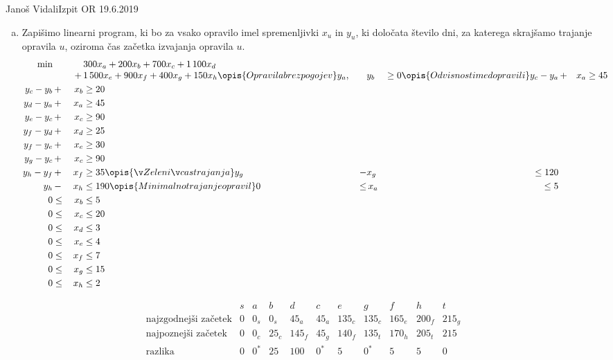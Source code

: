 \begin{naloga}{Janoš Vidali}{Izpit OR 19.6.2019}
\begin{odgovor}
\begin{enumerate}[(a)]
\item Zapišimo linearni program,
ki bo za vsako opravilo imel spremenljivki $x_u$ in $y_u$,
ki določata število dni, za katerega skrajšamo trajanje opravila $u$,
oziroma čas začetka izvajanja opravila $u$.
\begin{alignat*}{2}
\min &&&{} 300 x_a + 200 x_b + 700 x_c + 1\,100 x_d \\[-1mm]
&&+\,&{} 1\,500 x_e + 900 x_f + 400 x_g + 150 x_h
\opis{Opravila brez pogojev}
y_a, &&{} y_b &\ge 0
\opis{Odvisnosti med opravili}
y_c - y_a &\,+& x_a &\ge 45 \\
y_c - y_b &\,+& x_b &\ge 20 \\
y_d - y_a &\,+& x_a &\ge 45 \\
y_e - y_c &\,+& x_c &\ge 90 \\
y_f - y_d &\,+& x_d &\ge 25 \\
y_f - y_e &\,+& x_e &\ge 30 \\
y_g - y_c &\,+& x_c &\ge 90 \\
y_h - y_f &\,+& x_f &\ge 35
\opis{Želeni čas trajanja}
y_g &\,-& x_g &\le 120 \\
y_h &\,-& x_h &\le 190
\opis{Minimalno trajanje opravil}
0 &\le&\, x_a &\le 5 \\
0 &\le&\, x_b &\le 5 \\
0 &\le&\, x_c &\le 20 \\
0 &\le&\, x_d &\le 3 \\
0 &\le&\, x_e &\le 4 \\
0 &\le&\, x_f &\le 7 \\
0 &\le&\, x_g &\le 15 \\
0 &\le&\, x_h &\le 2
\end{alignat*}
\end{enumerate}
%
\begin{slika}
\pgfslika
{}
\end{slika}
%
\begin{tabela}
$$
\begin{array}{c|cccccccccc}
& s & a & b & d & c & e & g & f & h & t \\ \hline
\text{najzgodnejši začetek} &
0 & 0_s & 0_s & 45_a & 45_a & 135_c & 135_c & 165_e & 200_f & 215_g \\
\text{najpoznejši začetek} &
0 & 0_c & 25_c & 145_f & 45_g & 140_f & 135_t & 170_h & 205_t & 215 \\
\text{razlika} &
0 & 0^* & 25 & 100 & 0^* & 5 & 0^* & 5 & 5 & 0
\end{array}
$$
\end{tabela}
\end{odgovor}
\end{naloga}
